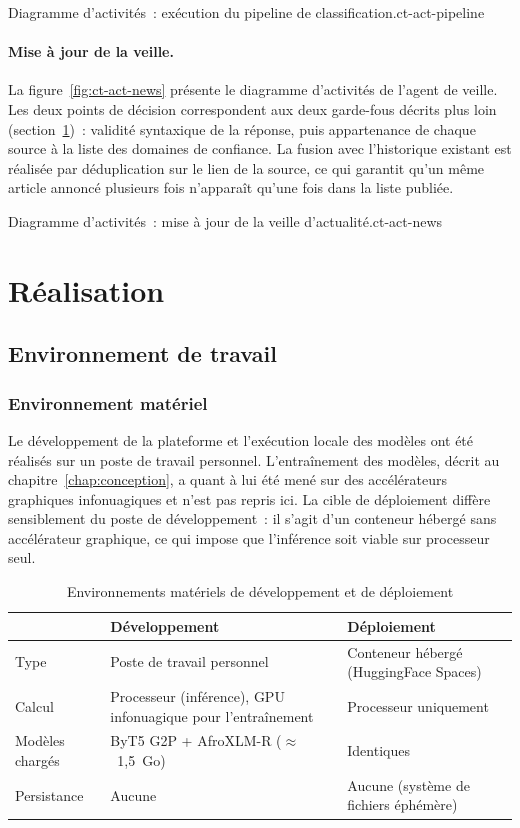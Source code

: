 {Diagramme d'activités~: exécution du pipeline de classification.}{ct-act-pipeline}

\paragraph{Mise à jour de la veille.}
La figure~\ref{fig:ct-act-news} présente le diagramme d'activités de l'agent de
veille. Les deux points de décision correspondent aux deux garde-fous décrits plus
loin (section~\ref{sec:ct-realisation})~: validité syntaxique de la réponse, puis
appartenance de chaque source à la liste des domaines de confiance. La fusion avec
l'historique existant est réalisée par déduplication sur le lien de la source, ce qui
garantit qu'un même article annoncé plusieurs fois n'apparaît qu'une fois dans la
liste publiée.

{Diagramme d'activités~: mise à jour de la veille d'actualité.}{ct-act-news}

\section{Réalisation}
\label{sec:ct-realisation}

\subsection{Environnement de travail}

\subsubsection{Environnement matériel}

Le développement de la plateforme et l'exécution locale des modèles ont été réalisés
sur un poste de travail personnel. L'entraînement des modèles, décrit au
chapitre~\ref{chap:conception}, a quant à lui été mené sur des accélérateurs
graphiques infonuagiques et n'est pas repris ici. La cible de déploiement diffère
sensiblement du poste de développement~: il s'agit d'un conteneur hébergé sans
accélérateur graphique, ce qui impose que l'inférence soit viable sur processeur seul.

\begin{table}[H]
	\centering
	\caption{Environnements matériels de développement et de déploiement}
	\label{tab:ct-materiel}
	\begin{tabularx}{\textwidth}{@{} L{4.2cm} X X @{}}
		\toprule
		 & \textbf{Développement} & \textbf{Déploiement} \\
		\midrule
		Type          & Poste de travail personnel & Conteneur hébergé (HuggingFace Spaces) \\
		Calcul        & Processeur (inférence), GPU infonuagique pour l'entraînement & Processeur uniquement \\
		Modèles chargés & ByT5 G2P + AfroXLM-R ($\approx$~1,5~Go) & Identiques \\
		Persistance   & Aucune & Aucune (système de fichiers éphémère) \\
		\bottomrule
	\end{tabularx}
\end{table}

